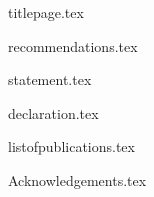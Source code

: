 \documentclass[a4paper,12pt,twoside,openany]{book}
\begin{document}
\thispagestyle{empty}

{titlepage.tex}

\normalsize

\afterpage{
  \null
  \thispagestyle{empty}
  \newpage
}

\doublespacing

{recommendations.tex}

\clearpage{\thispagestyle{empty}\cleardoublepage}

{statement.tex}

\clearpage{\thispagestyle{empty}\cleardoublepage}

{declaration.tex}

\clearpage{\thispagestyle{empty}\cleardoublepage}

\clearpage{\thispagestyle{empty}\cleardoublepage}

{listofpublications.tex}

\clearpage{\thispagestyle{empty}\cleardoublepage}

{Acknowledgements.tex}

\clearpage{\thispagestyle{empty}\cleardoublepage}


\normalsize

\tableofcontents

\clearpage{\thispagestyle{empty}\cleardoublepage}
\end{document}
